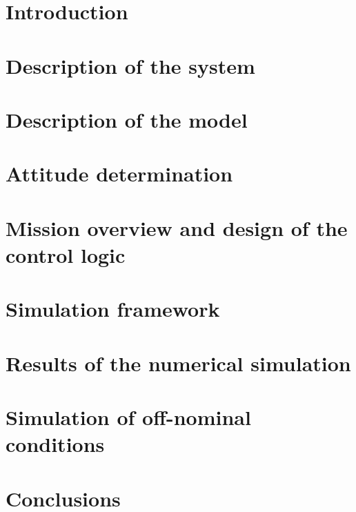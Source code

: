 \documentclass[11.5pt]{article}
\begin{document}



\tableofcontents

\clearpage

\setcounter{page}{1}

\section{Introduction} \label{sec:introduction}



\section{Description of the system}



\section{Description of the model}



\section{Attitude determination} \label{sec:attitude_determination}



\section{Mission overview and design of the control logic} \label{sec:control}



\section{Simulation framework}



\section{Results of the numerical simulation}



\section{Simulation of off-nominal conditions}



\section{Conclusions}



\clearpage

\printbibliography[heading=bibintoc, title = {References}]
\end{document}
